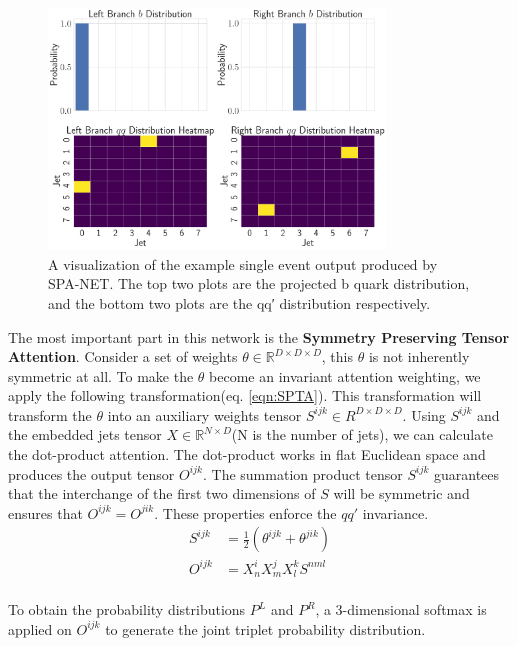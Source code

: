\begin{figure}[H]
	\centering
	\includegraphics[width=0.8\textwidth]{Figures/typical_output.pdf}
	\caption{A visualization of the example single event output produced by SPA-NET. The top two plots are the projected b quark distribution, and the bottom two plots are the qq′ distribution respectively. }
	\label{fig:output}
\end{figure}
The most important part in this network is the \textbf{Symmetry Preserving Tensor Attention}. Consider a set of weights $\theta \in \mathbb{R}^{D\times D\times D}$, this $\theta$ is not inherently symmetric at all. To make the $\theta$ become an invariant attention weighting, we apply the following transformation(eq. \ref{eqn:SPTA}). This transformation will transform the $\theta$ into an auxiliary weights tensor $S^{ijk}\in R^{D\times D\times D}$. Using $S^{ijk}$ and the embedded jets tensor $X \in \mathbb{R}^{N\times D}$(N is the number of jets), we can calculate the dot-product attention. The dot-product works in flat Euclidean space and produces the output tensor $O^{ijk}$. The summation product tensor $S^{ijk}$ guarantees that the interchange of the first two dimensions of $S$ will be symmetric and ensures that $O^{ijk}=O^{jik}$. These properties enforce the $qq'$ invariance.
\\
\begin{equation}\label{eqn:SPTA}
	\begin{split}
	S^{ijk} &= \frac{1}{2}\left( \theta^{ijk} + \theta^{jik}\right) \\
	O^{ijk} &= X^{i}_{n}X^{j}_{m}X^{k}_{l}S^{nml}
		\end{split}
\end{equation}
\\
To obtain the probability distributions $P^{L}$ and $P^{R}$, a 3-dimensional softmax is applied on $O^{ijk}$ to generate the joint triplet probability distribution.
